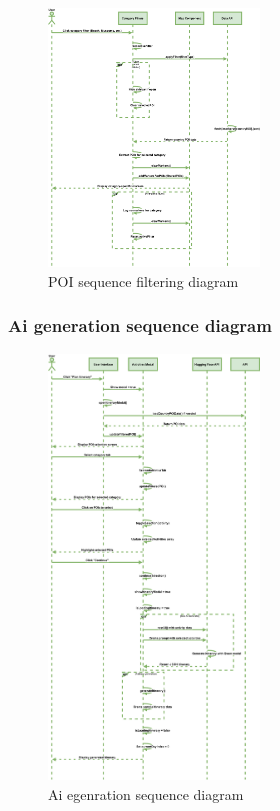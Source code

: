 \documentclass[]{project_final}
\begin{document}
\begin{figure}[ht!]
    \centering
    \includegraphics[width=0.5\textwidth]{TPpoiSequenceDiagram.png}
    \vspace*{0.0cm}
    \caption{POI sequence filtering diagram}
    \label{fig:1}
\end{figure}
\newpage
\subsubsection{Ai generation sequence diagram}

\begin{figure}[ht!]
    \centering
    \includegraphics[width=0.5\textwidth]{TPaiGenerationSequence.png}
    \vspace*{0.0cm}
    \caption{Ai egenration sequence diagram}
    \label{fig:1}
\end{figure}
\newpage
\end{document}
